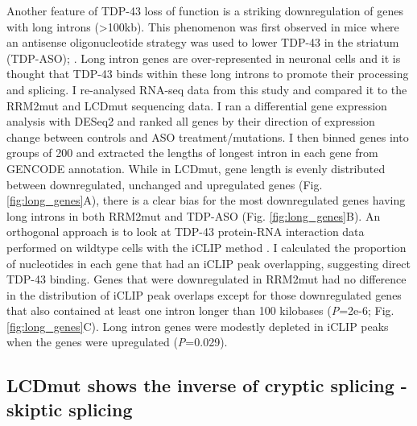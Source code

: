 Another feature of TDP-43 loss of function is a striking downregulation of genes with long introns (>100kb). This phenomenon was first observed in mice where an antisense oligonucleotide strategy was used to lower TDP-43 in the striatum (TDP-ASO); \citep{Polymenidou2011-hs}. Long intron genes are over-represented in neuronal cells \citep{Sibley2015} and it is thought that TDP-43 binds within these long introns to promote their processing and splicing. I re-analysed RNA-seq data from this study and compared it to the RRM2mut and LCDmut sequencing data. I ran a differential gene expression analysis with DESeq2 and ranked all genes by their direction of expression change between controls and ASO treatment/mutations. I then binned genes into groups of 200 and extracted the lengths of longest intron in each gene from GENCODE annotation. While in LCDmut, gene length is evenly distributed between downregulated, unchanged and upregulated genes (Fig. \ref{fig:long_genes}A), there is a clear bias for the most downregulated genes having long introns in both RRM2mut and TDP-ASO (Fig. \ref{fig:long_genes}B). An orthogonal approach is to look at TDP-43 protein-RNA interaction data performed on wildtype cells with the iCLIP method \citep{Huppertz2014-ip}. I calculated the proportion of nucleotides in each gene that had an iCLIP peak overlapping, suggesting direct TDP-43 binding. Genes that were downregulated in RRM2mut had no difference in the distribution of iCLIP peak overlaps except for those downregulated genes that also contained at least one intron longer than 100 kilobases (\textit{P}=2e-6; Fig. \ref{fig:long_genes}C). Long intron genes were modestly depleted in iCLIP peaks when the genes were upregulated (\textit{P}=0.029).


\subsection{LCDmut shows the inverse of cryptic splicing - skiptic splicing}

